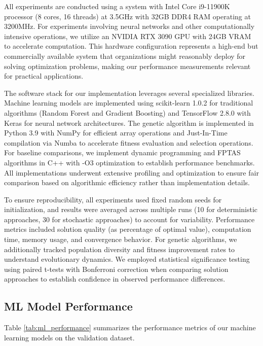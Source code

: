 \documentclass[conference, a4paper]{IEEEtran}
\begin{document}
All experiments are conducted using a system with Intel Core i9-11900K processor (8 cores, 16 threads) at 3.5GHz with 32GB DDR4 RAM operating at 3200MHz. For experiments involving neural networks and other computationally intensive operations, we utilize an NVIDIA RTX 3090 GPU with 24GB VRAM to accelerate computation. This hardware configuration represents a high-end but commercially available system that organizations might reasonably deploy for solving optimization problems, making our performance measurements relevant for practical applications.

The software stack for our implementation leverages several specialized libraries. Machine learning models are implemented using scikit-learn 1.0.2 for traditional algorithms (Random Forest and Gradient Boosting) and TensorFlow 2.8.0 with Keras for neural network architectures. The genetic algorithm is implemented in Python 3.9 with NumPy for efficient array operations and Just-In-Time compilation via Numba to accelerate fitness evaluation and selection operations. For baseline comparisons, we implement dynamic programming and FPTAS algorithms in C++ with -O3 optimization to establish performance benchmarks. All implementations underwent extensive profiling and optimization to ensure fair comparison based on algorithmic efficiency rather than implementation details.

To ensure reproducibility, all experiments used fixed random seeds for initialization, and results were averaged across multiple runs (10 for deterministic approaches, 30 for stochastic approaches) to account for variability. Performance metrics included solution quality (as percentage of optimal value), computation time, memory usage, and convergence behavior. For genetic algorithms, we additionally tracked population diversity and fitness improvement rates to understand evolutionary dynamics. We employed statistical significance testing using paired t-tests with Bonferroni correction when comparing solution approaches to establish confidence in observed performance differences.

\subsection{ML Model Performance}
Table \ref{tab:ml_performance} summarizes the performance metrics of our machine learning models on the validation dataset.
\end{document}
